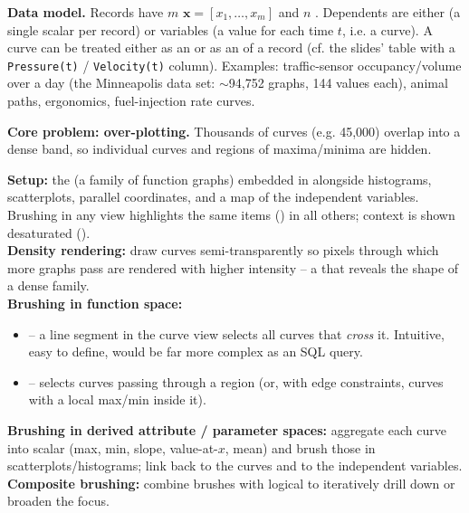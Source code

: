 \textbf{Data model.} Records have $m$ 
$\mathbf{x}=[x_1,\dots,x_m]$ and $n$ . Dependents are
either  (a single scalar per record) or 
variables (a value for each time $t$, i.e. a curve). A curve can be treated
either as an  or as an  of a
record (cf. the slides' table with a \texttt{Pressure(t)} / \texttt{Velocity(t)}
column). Examples: traffic-sensor occupancy/volume over a day (the Minneapolis
data set: $\sim$94{,}752 graphs, 144 values each), animal paths, ergonomics,
fuel-injection rate curves.

\textbf{Core problem: over-plotting.} Thousands of curves
(e.g. 45{,}000) overlap into a dense band, so individual curves and
regions of maxima/minima are hidden.

\begin{algobox}
\textbf{Setup:} the  (a family of function graphs) embedded in
 alongside histograms, scatterplots,
parallel coordinates, and a map of the independent variables. Brushing in any
view highlights the same items () in all others; context is shown
desaturated ().\\
\textbf{Density rendering:} draw curves semi-transparently so pixels through
which more graphs pass are rendered with higher intensity -- a  that reveals the shape of a dense family.\\
\textbf{Brushing in function space:}
\begin{itemize}
\item {} -- a line segment in the curve view selects all curves
  that \emph{cross} it. Intuitive, easy to define, would be far more complex as
  an SQL query.
\item {} -- selects curves passing through a
  region (or, with edge constraints, curves with a local max/min inside it).
\end{itemize}
\textbf{Brushing in derived attribute / parameter spaces:} aggregate each curve
into scalar  (max, min, slope, value-at-$x$, mean) and
brush those in scatterplots/histograms; link back to the curves and to the
independent variables.\\
\textbf{Composite brushing:} combine brushes with logical 
to iteratively drill down or broaden the focus.
\end{algobox}

